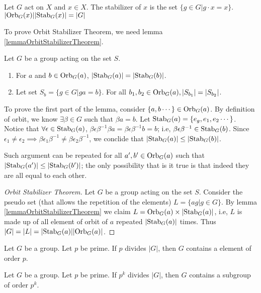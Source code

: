 \documentclass[../note.tex]{subfiles}
\begin{document}
\begin{theorem}
	Let $G$ act on $X$ and $x \in X$. The stabilizer of $x$ is the set $\{g \in G | g\cdot x = x\}$.
	$|\text{Orb}_{G}({x})||\text{Stab}_{G}({x})|=|G|$
\end{theorem}

To prove Orbit Stabilizer Theorem, we need lemma \ref{lemmaOrbitStabilizerTheorem}.

\begin{lemma}\label{lemmaOrbitStabilizerTheorem}
	Let $G$ be a group acting on the set $S$.
\begin{enumerate}
	\item For $a$ and $b\in \text{Orb}_{G}({a})$, $|\text{Stab}_{G}({a})|=|\text{Stab}_{G}({b})|$.
	\item Let set $S_b=\{g\in G| ga=b \}$. For all $b_1, b_2 \in \text{Orb}_{G}({a}), |S_{b_1}|=|S_{b_2}|$.
\end{enumerate}
\end{lemma}

To prove the first part of the lemma, consider $\{a,b \cdots\}\in \text{Orb}_{G}({a})$. By definition of orbit, we know $\exists \beta \in G $ such that $\beta a = b$.
Let $\text{Stab}_{G}({a}) = \{e_g, e_1, e_2 \cdots\}$. Notice that $\forall \epsilon \in \text{Stab}_{G}({a})$, $\beta \epsilon \beta^{-1} \beta a = \beta \epsilon \beta^{-1} b = b$; i.e, $\beta \epsilon \beta^{-1} \in \text{Stab}_{G}({b})$. 
Since $\epsilon_1 \neq \epsilon_2 \implies \beta \epsilon_1 \beta^{-1} \neq \beta \epsilon_2 \beta ^{-1}$, we conclide that $|\text{Stab}_{G}({a})| \leq |\text{Stab}_{G}({b})| $.

Such argument can be repeated for all $a',b' \in \text{Orb}_{G}({a})$ such that $|\text{Stab}_{G}({a'})| \leq |\text{Stab}_{G}({b'})|$; the only possibility that is it true is that indeed they are all equal to each other.

\begin{proof}[Orbit Stabilizer Theorem]
	Let $G$ be a group acting on the set $S$. 
	Consider the pseudo set (that allows the repetition of the elements) $L=\{ag| g\in G\}$. 
	By lemma \ref{lemmaOrbitStabilizerTheorem} we claim $L=\text{Orb}_{G}({a}) \times |\text{Stab}_{G}({a})|$, i.e, $L$ is made up of all element of orbit of $a$ repeated $|\text{Stab}_{G}({a})|$ times. Thus $|G|=|L|=|\text{Stab}_{G}({a})||\text{Orb}_{G}({a})|$.
\end{proof}

\begin{theorem}
	Let $G$ be a group. Let $p$ be prime. If $p$ divides $|G|$, then $G$ contains a element of order $p$.
\end{theorem}

\begin{theorem}
	Let $G$ be a group. Let $p$ be prime. If $p^k$ divides $|G|$, then $G$ contains a subgroup of order $p^k$.
\end{theorem}
\end{document}

